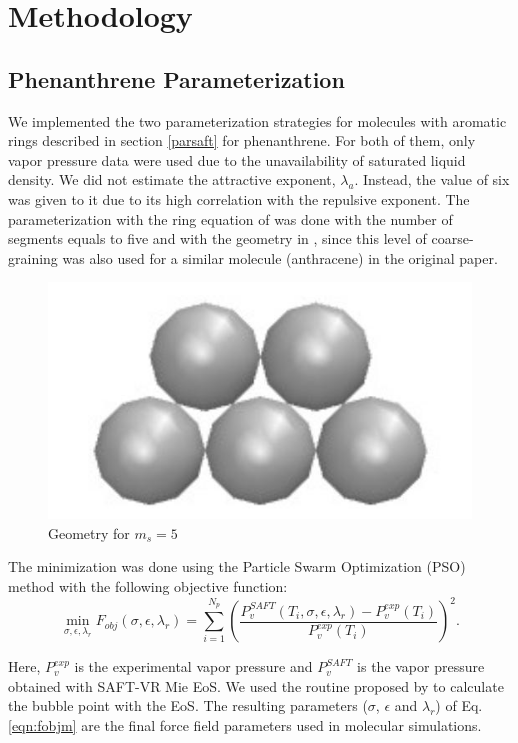 \chapter{Methodology} %

\label{Chapter4} %

\section{Phenanthrene Parameterization}\label{parame}

We implemented the two parameterization strategies for molecules with aromatic rings described in section \ref{parsaft} for phenanthrene. For both of them, only vapor pressure data \cite{pvphen} were used due to the unavailability of saturated liquid density. We did not estimate the attractive exponent, $\lambda _{a}$. Instead, the value of six was given to it due to its high correlation with the repulsive exponent. The parameterization with the ring equation of  was done with the number of segments equals to five and with the geometry in , since this level of coarse-graining was also used for a similar molecule (anthracene) in the original paper.
\begin{figure}[th]
	\centering
	\includegraphics[width=0.25\linewidth]{Figures/fen5}
	\caption{Geometry for $m_{s}=5$}
	\label{fig:fen5}
\end{figure}

The minimization was done using the Particle Swarm Optimization (PSO)  method \cite{pso} with the following objective function:
\begin{equation}
\min\limits_{\sigma,\epsilon,\lambda_{r}} F_{obj}(\sigma,\epsilon,\lambda_{r})= \sum_{i=1}^{N_{p}} \left(\frac{P_{v}^{SAFT}(T_{i},\sigma,\epsilon,\lambda_{r})-P_{v}^{exp}(T_{i})}{P_{v}^{exp}(T_{i})} \right)^2 .
\label{eqn:fobjm}
\end{equation}

Here, $P_{v}^{exp}$ is the experimental vapor pressure and $P_{v}^{SAFT}$ is the vapor pressure obtained with SAFT-VR Mie EoS. We used the routine proposed by   to calculate the bubble point with the EoS. The resulting  parameters ($\sigma$, $\epsilon $ and $\lambda _{r}$) of Eq. \eqref{eqn:fobjm} are the final force field parameters used in molecular simulations. 

